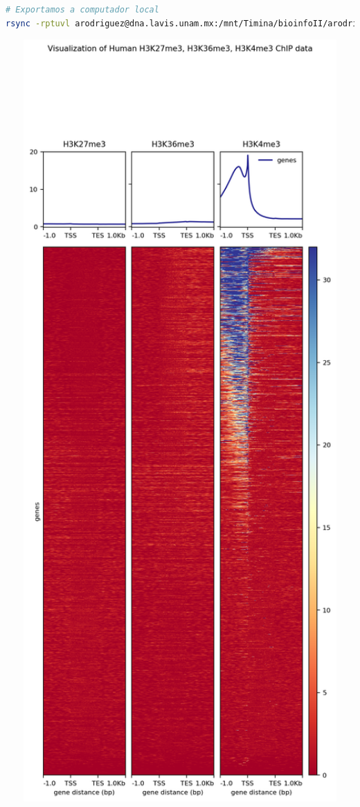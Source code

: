 \documentclass[
]{article}
\begin{document}
\begin{lstlisting}[language=bash]
# Exportamos a computador local
rsync -rptuvl arodriguez@dna.lavis.unam.mx:/mnt/Timina/bioinfoII/arodriguez/Visualization/HistonesHeatmap.png .
\end{lstlisting}

\begin{center}\includegraphics[width=600px]{./T04_images/HistonesHeatmap} \end{center}
\end{document}
